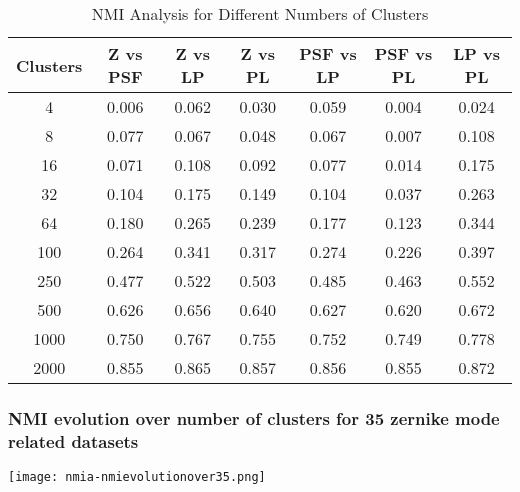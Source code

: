 \begin{table}[h!]
\centering
\begin{tabular}{|c|c|c|c|c|c|c|}
\hline
\textbf{Clusters} & \textbf{Z vs PSF} & \textbf{Z vs LP} & \textbf{Z vs PL} & \textbf{PSF vs LP} & \textbf{PSF vs PL} & \textbf{LP vs PL} \\
\hline
4   & 0.006 & 0.062 & 0.030 & 0.059 & 0.004 & 0.024 \\
8   & 0.077 & 0.067 & 0.048 & 0.067 & 0.007 & 0.108 \\
16  & 0.071 & 0.108 & 0.092 & 0.077 & 0.014 & 0.175 \\
32  & 0.104 & 0.175 & 0.149 & 0.104 & 0.037 & 0.263 \\
64  & 0.180 & 0.265 & 0.239 & 0.177 & 0.123 & 0.344 \\
100 & 0.264 & 0.341 & 0.317 & 0.274 & 0.226 & 0.397 \\
250 & 0.477 & 0.522 & 0.503 & 0.485 & 0.463 & 0.552 \\
500 & 0.626 & 0.656 & 0.640 & 0.627 & 0.620 & 0.672 \\
1000 & 0.750 & 0.767 & 0.755 & 0.752 & 0.749 & 0.778 \\
2000 & 0.855 & 0.865 & 0.857 & 0.856 & 0.855 & 0.872 \\
\hline
\end{tabular}
\caption{NMI Analysis for Different Numbers of Clusters}
\end{table}
		\FloatBarrier
		
	
	\subsubsection{NMI evolution over number of clusters for 35 zernike mode related datasets}
		\begin{figure*}[ht!]
			\centering
			\texttt{[image: nmia-nmievolutionover35.png]}
		\end{figure*}
		

